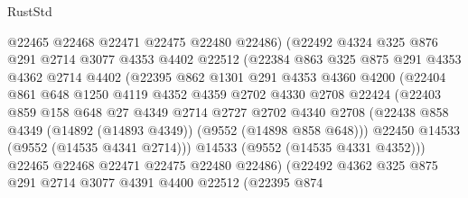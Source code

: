 \begin{lexlean}{RustStd}
\begin{coremodule}
                      @22465
                      @22468
                      @22471
                      @22475
                      @22480
                      @22486)
                    (@22492
                      @4324
                      @325
                      @876
                      @291
                      @2714
                      @3077
                      @4353
                      @4402
                      @22512
                      (@22384
                        @863
                        @325
                        @875
                        @291
                        @4353
                        @4362
                        @2714
                        @4402
                        (@22395
                          @862
                          @1301
                          @291
                          @4353
                          @4360
                          @4200
                          (@22404
                            @861
                            @648
                            @1250
                            @4119
                            @4352
                            @4359
                            @2702
                            @4330
                            @2708
                            @22424
                            (@22403
                              @859
                              @158
                              @648
                              @27
                              @4349
                              @2714
                              @2727
                              @2702
                              @4340
                              @2708
                              (@22438 @858 @4349 (@14892 (@14893 @4349)) (@9552 (@14898 @858 @648)))
                              @22450
                              @14533
                              (@9552 (@14535 @4341 @2714)))
                            @14533
                            (@9552 (@14535 @4331 @4352)))
                          @22465
                          @22468
                          @22471
                          @22475
                          @22480
                          @22486)
                        (@22492
                          @4362
                          @325
                          @875
                          @291
                          @2714
                          @3077
                          @4391
                          @4400
                          @22512
                          (@22395
                            @874

\end{coremodule}
\end{lexlean}
